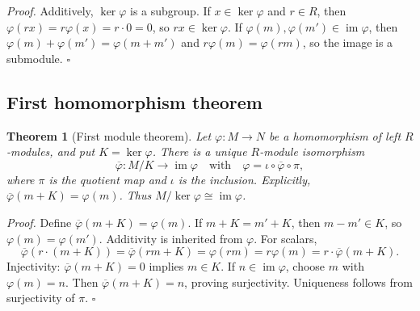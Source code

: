 \documentclass[11pt,letterpaper]{article}
\newcommand{\Map}[3]{#1 \colon #2 \to #3}
\newtheorem{theorem}{Theorem}
\newenvironment{proof}{\noindent\textit{Proof.}}{\hfill\(\square\)}
\begin{document}
\begin{proof}
Additively, \(\ker\varphi\) is a subgroup. If \(x\in\ker\varphi\) and \(r\in R\), then \(\varphi(rx)=r\varphi(x)=r\cdot 0=0\), so \(rx\in\ker\varphi\). If \(\varphi(m),\varphi(m')\in\operatorname{im}\varphi\), then \(\varphi(m)+\varphi(m')=\varphi(m+m')\) and \(r\varphi(m)=\varphi(rm)\), so the image is a submodule.
\end{proof}

\subsection{First homomorphism theorem}

\begin{theorem}[First module theorem]
\label{thm:mod-first}
Let \(\Map{\varphi}{M}{N}\) be a homomorphism of left \(R\)-modules, and put \(K=\ker\varphi\). There is a unique \(R\)-module isomorphism
\[
\Map{\overline{\varphi}}{M/K}{\operatorname{im}\varphi}
\quad\text{with}\quad
\varphi=\iota\circ\overline{\varphi}\circ\pi,
\]
where \(\pi\) is the quotient map and \(\iota\) is the inclusion. Explicitly, \(\overline{\varphi}(m+K)=\varphi(m)\). Thus \(M/\ker\varphi\cong\operatorname{im}\varphi\).
\end{theorem}

\begin{proof}
Define \(\overline{\varphi}(m+K)=\varphi(m)\). If \(m+K=m'+K\), then \(m-m'\in K\), so \(\varphi(m)=\varphi(m')\). Additivity is inherited from \(\varphi\). For scalars,
\[
\overline{\varphi}(r\cdot(m+K))=\overline{\varphi}(rm+K)=\varphi(rm)=r\varphi(m)=r\cdot\overline{\varphi}(m+K).
\]
Injectivity: \(\overline{\varphi}(m+K)=0\) implies \(m\in K\). If \(n\in\operatorname{im}\varphi\), choose \(m\) with \(\varphi(m)=n\). Then \(\overline{\varphi}(m+K)=n\), proving surjectivity. Uniqueness follows from surjectivity of \(\pi\).
\end{proof}

\begin{center}
\end{center}
\end{document}
